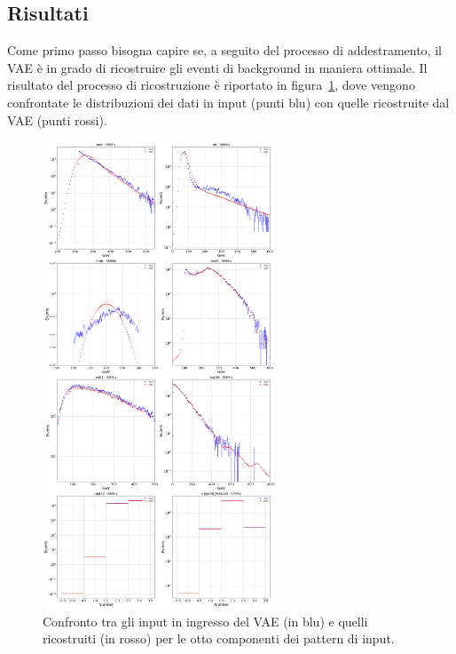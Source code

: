 \subsection{Risultati}
\label{risultati}
Come primo passo bisogna capire se, a seguito del processo di addestramento, il VAE è in grado di ricostruire gli eventi di background in maniera ottimale. Il risultato del processo di ricostruzione è riportato in figura~\ref{ricostruzione}, dove vengono confrontate le distribuzioni dei dati in input (punti blu) con quelle ricostruite dal VAE (punti rossi). 
\begin{figure}[h!]
	\centering
	\includegraphics[width=0.62\textwidth]{figs/risultati_simulazione/ricostruzione.png}
	\caption{Confronto tra gli input in ingresso del VAE (in blu) e quelli ricostruiti (in rosso) per le otto componenti dei pattern di input.}
	\label{ricostruzione}
\end{figure}

